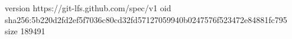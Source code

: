version https://git-lfs.github.com/spec/v1
oid sha256:5b220d2fd2ef5f7036c80cd32fd57127059940b0247576f523472e84881fc795
size 189491
